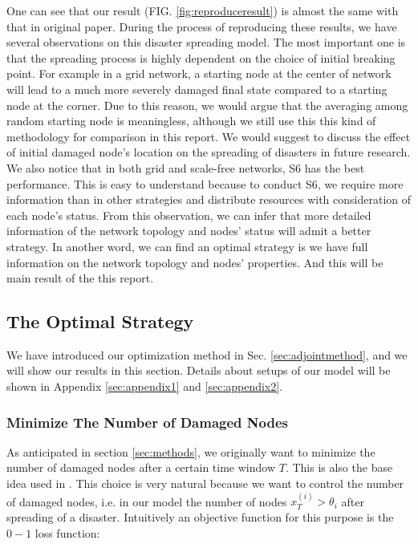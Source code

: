 %
One can see that our result (FIG. \ref{fig:reproduceresult}) is almost the same with that in original paper\cite{buzna2007efficient}. During the process of reproducing these results, we have several observations on this disaster spreading model. The most important one is that the spreading process is highly dependent on the choice of initial breaking point. For example in a grid network, a starting node at the center of network will lead to a much more severely damaged final state compared to a starting node at the corner. Due to this reason, we would argue that the averaging among random starting node is meaningless, although we still use this this kind of methodology for comparison in this report. We would suggest to discuss the effect of initial damaged node's location on the spreading of disasters in future research. We also notice that in both grid and scale-free networks, S6 has the best performance. This is easy to understand because to conduct S6, we require more information than in other strategies and distribute resources with consideration of each node's status. From this observation, we can infer that more detailed information of the network topology and nodes' status will admit a better strategy. In another word, we can find an optimal strategy is we have full information on the network topology and nodes' properties. And this will be main result of the this report.

\subsection{The Optimal Strategy}
We have introduced our optimization method in Sec. \ref{sec:adjointmethod}, and we will show our results in this section. Details about setups of our model will be shown in Appendix \ref{sec:appendix1} and \ref{sec:appendix2}. 

\subsubsection{Minimize The Number of Damaged Nodes}
As anticipated in section \ref{sec:methods}, we originally want to minimize the number of damaged nodes after a certain time window $T$. This is also the base idea used in \cite{buzna2007efficient}. This choice is very natural because we want to control the number of damaged nodes, i.e. in our model the number of nodes $x^{(i)}_T>\theta_i$ after spreading of a disaster. Intuitively an objective function for this purpose is the $0-1$ loss function:


